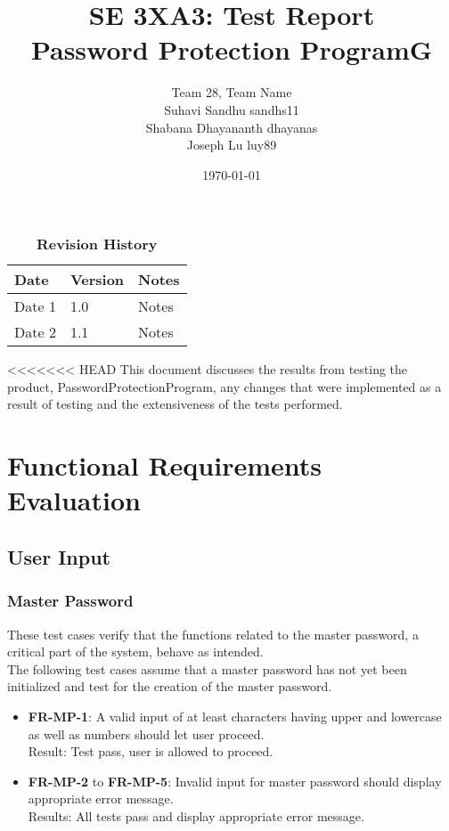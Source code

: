 \documentclass[12pt, titlepage]{article}
\title{SE 3XA3: Test Report\\Password Protection ProgramG}
\author{Team 28, Team Name
		\\ Suhavi Sandhu sandhs11
		\\ Shabana Dhayananth dhayanas
		\\ Joseph Lu luy89
}
\date{\today}
\begin{document}
\maketitle

\tableofcontents
\listoftables
\listoffigures

\begin{table}[bp]
\caption{\bf Revision History}
\begin{tabularx}{\textwidth}{p{3cm}p{2cm}X}
\toprule {\bf Date} & {\bf Version} & {\bf Notes}\\
\midrule
Date 1 & 1.0 & Notes\\
Date 2 & 1.1 & Notes\\
\bottomrule
\end{tabularx}
\end{table}

\newpage


<<<<<<< HEAD
This document discusses the results from testing the product, PasswordProtectionProgram, any changes that were implemented as a result of testing and the extensiveness of the tests performed.

\section{Functional Requirements Evaluation}

	\subsection{User Input}
	
		\subsubsection{Master Password}
			These test cases verify that the functions related to the master password, a critical part of the system, behave as intended.\\
			
			The following test cases assume that a master password has not yet been initialized and test for the creation of the master password.
			
			\begin{itemize}
			
				\item \textbf{FR-MP-1}: A valid input of at least characters having upper and lowercase as well as numbers should let user proceed.\\
				 Result: Test pass, user is allowed to proceed.
				 
				\item \textbf{FR-MP-2} to \textbf{FR-MP-5}: Invalid input for master password should display appropriate error message.\\
				 Results: All tests pass and display appropriate error message.
			
			\end{itemize}
			 
\end{document}

